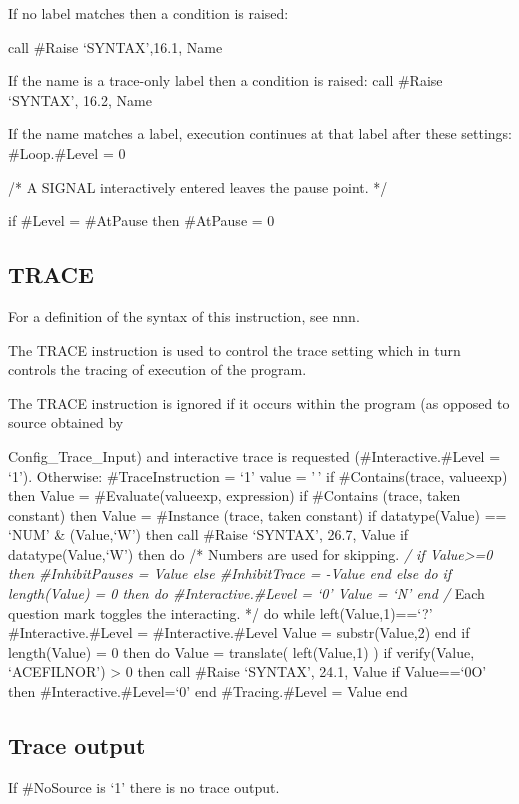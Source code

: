 If no label matches then a condition is raised:

call \#Raise `SYNTAX',16.1, Name

If the name is a trace-only label then a condition is raised: call
\#Raise `SYNTAX', 16.2, Name

If the name matches a label, execution continues at that label after
these settings: \#Loop.\#Level = 0

/* A SIGNAL interactively entered leaves the pause point. */

if \#Level = \#AtPause then \#AtPause = 0

\subsection{TRACE}\label{trace}

For a definition of the syntax of this instruction, see nnn.

The TRACE instruction is used to control the trace setting which in turn
controls the tracing of execution of the program.

The TRACE instruction is ignored if it occurs within the program (as
opposed to source obtained by

Config\_Trace\_Input) and interactive trace is requested
(\#Interactive.\#Level = `1'). Otherwise: \#TraceInstruction = `1' value
= '\,' if \#Contains(trace, valueexp) then Value = \#Evaluate(valueexp,
expression) if \#Contains (trace, taken constant) then Value =
\#Instance (trace, taken constant) if datatype(Value) == `NUM' \&
\datatype(Value,`W') then call \#Raise `SYNTAX', 26.7, Value if
datatype(Value,`W') then do /* Numbers are used for skipping. \emph{/ if
Value\textgreater=0 then \#InhibitPauses = Value else \#InhibitTrace =
-Value end else do if length(Value) = 0 then do \#Interactive.\#Level =
`0' Value = `N' end /} Each question mark toggles the interacting. */ do
while left(Value,1)==`?' \#Interactive.\#Level = \#Interactive.\#Level
Value = substr(Value,2) end if length(Value) = 0 then do Value =
translate( left(Value,1) ) if verify(Value, `ACEFILNOR') \textgreater{}
0 then call \#Raise `SYNTAX', 24.1, Value if Value==`0O' then
\#Interactive.\#Level=`0' end \#Tracing.\#Level = Value end

\subsection{Trace output}\label{trace-output}

If \#NoSource is `1' there is no trace output.

